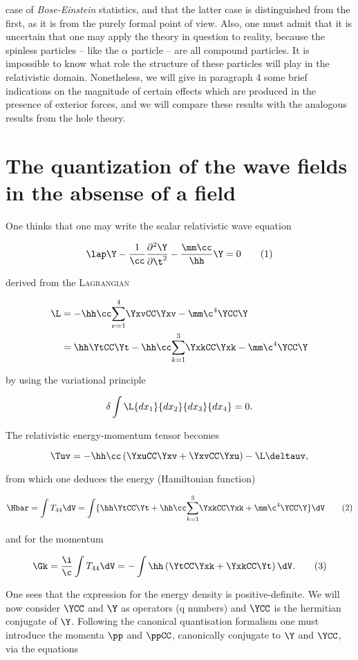 \documentclass{article}
\newcommand{\var}[1]{#1}
\newcommand{\comp}[1]{{#1}}
\newcommand{\pddXdYY}[2]{
\frac{\partial^2 {#1}}{\partial {#2}^2}
}
\newcommand{\inv}[1]{\frac{1}{#1}}
\newcommand{\dx}[1]{{\var{dx}_{#1}}}
\newcommand{\Tij}[2]{{\var{T}_{\comp{#1}\comp{#2}}}}
\renewcommand{\it}[1]{\textit{#1}}
\renewcommand{\sc}[1]{\textsc{#1}}
\newcommand{\sumXY}[2]{\underset{#1}{\overset{#2}{\sum}}}
\newcommand{\nequ}[2]{
\begin{equation*}
#1
\tag{#2}
\end{equation*}
}
\newcommand{\uequ}[1]{
\begin{equation*}
#1
\end{equation*}
}
\begin{document}
case of \it{Bose-Einstein} statistics, and that the latter case is distinguished from the first, as it is from the purely formal point of view. Also, one must admit that it is uncertain that one may apply the theory in question to reality, because the spinless particles -- like the $\alpha$ particle -- are all compound particles. It is impossible to know what role the structure of these particles will play in the relativistic domain. Nonetheless, we will give in paragraph 4 some brief indications on the magnitude of certain effects which are produced in the presence of exterior forces, and we will compare these results with the analogous results from the hole theory.

\section{The quantization of the wave fields in the absense of a field}

One thinks that one may write the scalar relativistic wave equation

\nequ{
\lap\Y - \inv{\cc}\pddXdYY{\Y}{\t} - \frac{\mm\cc}{\hh}\Y = 0
}{1}

derived from the \sc{Lagrangian}

\uequ{
\begin{split}
\L &= -\hh\cc\sumXY{\nu=1}{4}\YxvCC\Yxv - \mm\c^4\YCC\Y \\
 &= \hh\YtCC\Yt - \hh\cc\sumXY{k=1}{3}\YxkCC\Yxk - \mm\c^4\YCC\Y
\end{split}
}

by using the variational principle

\uequ{
\delta\int\L\dx{1}\dx{2}\dx{3}\dx{4} = 0.
}

The relativistic energy-momentum tensor becomes

\uequ{
\Tuv = -\hh\cc\left( \YxuCC\Yxv + \YxvCC\Yxu \right) - \L\deltauv,
}

from which one deduces the energy (Hamiltonian function)

\nequ{
\Hbar = \int\Tij{4}{4}\dV = \int\{\hh\YtCC\Yt +\hh\cc\sumXY{k=1}{3}\YxkCC\Yxk + \mm\c^4\YCC\Y\}\dV
}{2}

and for the momentum

\nequ{
\Gk = \frac{\i}{\c}\int\Tij{4}{4}\dV = -\int\hh\left( \YtCC\Yxk + \YxkCC\Yt \right)\dV.
}{3}

One sees that the expression for the energy density is positive-definite.
We will now consider $\YCC$ and $\Y$ as operators (q numbers) and $\YCC$ is the hermitian conjugate of $\Y$. Following the canonical quantisation formalism one must introduce the momenta $\pp$ and $\ppCC$, canonically conjugate to $\Y$ and $\YCC$, via the equations
\end{document}
